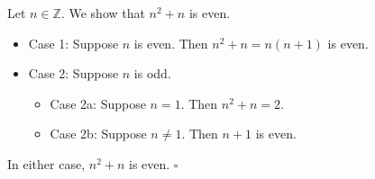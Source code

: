 Let $n \in \mathbb{Z}$.
We show that $n^{2} + n$ is even.

\begin{itemize}
  \item Case 1: Suppose $n$ is even.
    Then $n^{2} + n = n(n + 1)$ is even.
  \item Case 2: Suppose $n$ is odd.
    \begin{itemize}
      \item Case 2a: Suppose $n = 1$.
        Then $n^{2} + n = 2$.
      \item Case 2b: Suppose $n \neq 1$.
        Then $n + 1$ is even.
    \end{itemize}
\end{itemize}

In either case, $n^{2} + n$ is even. \hfill$\square$